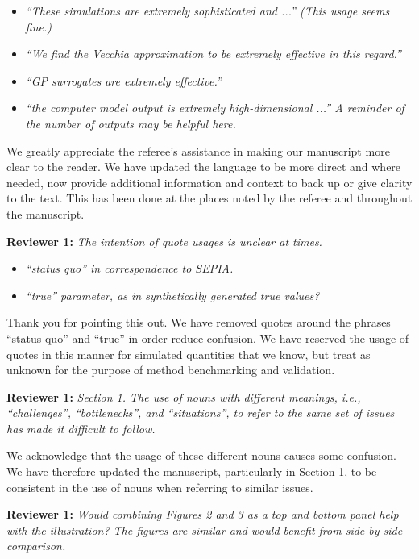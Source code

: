 \documentclass[12pt]{article}
\begin{document}
\begin{itemize}
	\item \textit{``These simulations are extremely sophisticated and ...''
	(This usage seems fine.)}
	\item \textit{``We find the Vecchia approximation to be extremely effective
	in this regard.''}
	\item \textit{``GP surrogates are extremely effective.''}
	\item \textit{``the computer model output is extremely high-dimensional
	...'' A reminder of the number of outputs may be helpful here.}
\end{itemize}

\bigskip
\noindent
We greatly appreciate the referee's assistance in making our manuscript more
clear to the reader. We have updated the language to be more direct and where
needed, now provide additional information and context to back up or give
clarity to the text. This has been done at the places noted by the referee and
throughout the manuscript.

\bigskip
\noindent
\textbf{Reviewer 1:} \textit{The intention of quote usages is unclear at times.}

\begin{itemize}
	\item \textit{``status quo'' in correspondence to SEPIA.}
	\item \textit{``true'' parameter, as in synthetically generated true values?}
\end{itemize}

\smallskip
\noindent
Thank you for pointing this out. We have removed quotes around the phrases
``status quo'' and ``true'' in order reduce confusion. We have reserved the
usage of quotes in this manner for simulated quantities that we know, but
treat as unknown for the purpose of method benchmarking and validation.

\bigskip
\noindent
\textbf{Reviewer 1:} \textit{Section 1. The use of nouns with different
meanings, i.e., ``challenges'', ``bottlenecks'', and ``situations'', to refer to the
same set of issues has made it difficult to follow.}

\bigskip
\noindent
We acknowledge that the usage of these different nouns causes some confusion.
We have therefore updated the manuscript, particularly in Section 1, to be
consistent in the use of nouns when referring to similar issues.

\bigskip
\noindent
\textbf{Reviewer 1:} \textit{Would combining Figures 2 and 3 as a top and
bottom panel help with the illustration? The figures are similar and would
benefit from side-by-side comparison.}
\end{document}

